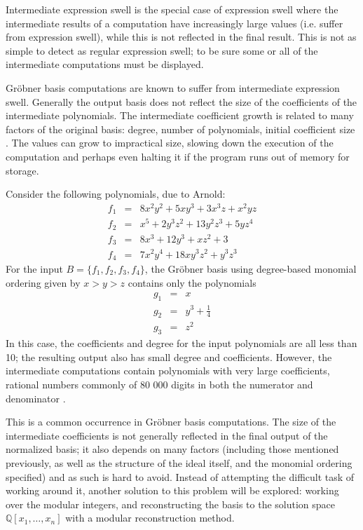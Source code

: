 \documentclass[letterpaper,12pt,titlepage,oneside,final]{book}
\begin{document}
Intermediate expression swell is the special case of expression swell where the intermediate results of a computation have increasingly large values (i.e. suffer from expression swell), while this is not reflected in the final result.  This is not as simple to detect as regular expression swell; to be sure some or all of the intermediate computations must be displayed. 

Gr\"obner basis computations are known to suffer from intermediate expression swell.  Generally the output basis does not reflect the size of the coefficients of the intermediate polynomials.  The intermediate coefficient growth is related to many factors of the original basis: degree, number of polynomials, initial coefficient size \cite{Geddes}.  The values can grow to impractical size, slowing down the execution of the computation and perhaps even halting it if the program runs out of memory for storage.  

Consider the following polynomials, due to Arnold: \cite{Arnold}
\begin{eqnarray*}
  f_1 &=& 8x^2y^2 + 5xy^3 + 3x^3z + x^2yz\\
  f_2 &=& x^5 + 2y^3z^2 + 13y^2z^3 + 5yz^4\\ 
  f_3 &=& 8x^3 + 12y^3 + xz^2 + 3\\
  f_4 &=& 7x^2y^4 + 18xy^3z^2 + y^3z^3
\end{eqnarray*} 
For the input ${B = \{f_1, f_2, f_3, f_4\}}$, the Gr\"obner basis using degree-based monomial ordering given by ${x > y > z}$ contains only the polynomials
\begin{eqnarray*}
  g_1 &=& x\\
  g_2 &=& y^3 + \frac{1}{4}\\ 
  g_3 &=& z^2
\end{eqnarray*} 
In this case, the coefficients and degree for the input polynomials are all less than 10; the resulting output also has small degree and coefficients.  However, the intermediate computations contain polynomials with very large coefficients, rational numbers commonly of 80 000 digits in both the numerator and denominator \cite{Arnold}.  

This is a common occurrence in Gr\"obner basis computations.  The size of the intermediate coefficients is not generally reflected in the final output of the normalized basis; it also depends on many factors (including those mentioned previously, as well as the structure of the ideal itself, and the monomial ordering specified) and as such is hard to avoid.  Instead of attempting the difficult task of working around it, another solution to this problem will be explored: working over the modular integers, and reconstructing the basis to the solution space ${\mathbb{Q}[x_1, \ldots, x_n]}$ with a modular reconstruction method.
\end{document}
